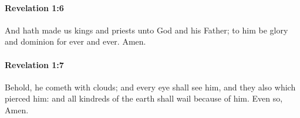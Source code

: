 		\paragraph{Revelation 1:6} %
			\label{REVELATIONNT-1-6}

			And hath made us kings and priests unto God and his Father; to him be glory and dominion for ever and ever. Amen.

			\begin{framed}
			\scriptsize
				\begin{compactdesc}
					\item[SBLG] 
				\end{compactdesc}
			\end{framed}

		\paragraph{Revelation 1:7} %
			\label{REVELATIONNT-1-7}

			Behold, he cometh with clouds; and every eye shall see him, and they also which pierced him: and all kindreds of the earth shall wail because of him. Even so, Amen.

